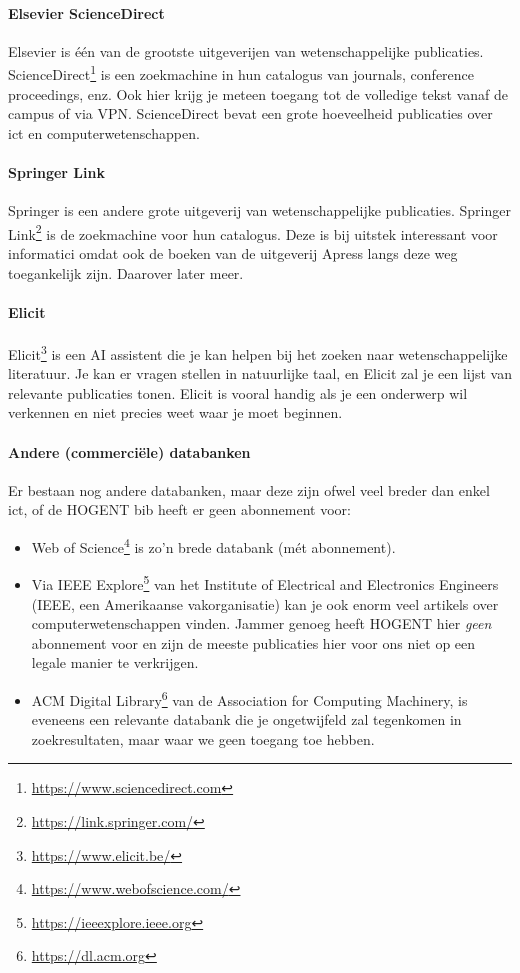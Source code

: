 \paragraph{Elsevier ScienceDirect}

Elsevier is één van de grootste uitgeverijen van wetenschappelijke publicaties. ScienceDirect\footnote{\url{https://www.sciencedirect.com}} is een zoekmachine in hun catalogus van journals, conference proceedings, enz. Ook hier krijg je meteen toegang tot de volledige tekst vanaf de campus of via VPN. ScienceDirect bevat een grote hoeveelheid publicaties over ict en computerwetenschappen.

\paragraph{Springer Link}

Springer is een andere grote uitgeverij van wetenschappelijke publicaties. Springer Link\footnote{\url{https://link.springer.com/}} is de zoekmachine voor hun catalogus. Deze is bij uitstek interessant voor informatici omdat ook de boeken van de uitgeverij Apress langs deze weg toegankelijk zijn. Daarover later meer.

\paragraph{Elicit}

Elicit\footnote{\url{https://www.elicit.be/}} is een AI assistent die je kan helpen bij het zoeken naar wetenschappelijke literatuur. Je kan er vragen stellen in natuurlijke taal, en Elicit zal je een lijst van relevante publicaties tonen. Elicit is vooral handig als je een onderwerp wil verkennen en niet precies weet waar je moet beginnen.

\paragraph{Andere (commerciële) databanken}

Er bestaan nog andere databanken, maar deze zijn ofwel veel breder dan enkel ict, of de HOGENT bib heeft er geen abonnement voor:

\begin{itemize}
  \item Web of Science\footnote{\url{https://www.webofscience.com/}} is zo'n brede databank (mét abonnement).

  \item Via IEEE Explore\footnote{\url{https://ieeexplore.ieee.org}} van het Institute of Electrical and Electronics Engineers (IEEE, een Amerikaanse vakorganisatie) kan je ook enorm veel artikels over computerwetenschappen vinden. Jammer genoeg heeft HOGENT hier \textit{geen} abonnement voor en zijn de meeste publicaties hier voor ons niet op een legale manier te verkrijgen.

  \item ACM Digital Library\footnote{\url{https://dl.acm.org}} van de Association for Computing Machinery, is eveneens een relevante databank die je ongetwijfeld zal tegenkomen in zoekresultaten, maar waar we geen toegang toe hebben.
\end{itemize}

